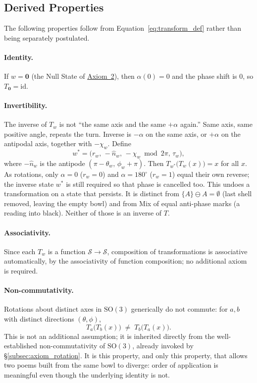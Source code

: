 \documentclass[12pt, a4paper]{article}
\begin{document}
\subsection{Derived Properties}
\label{subsec:transform_properties}
The following properties follow from Equation~\eqref{eq:transform_def}
rather than being separately postulated.

\paragraph{Identity.} If $w = \mathbf{0}$ (the Null State of
\hyperref[subsec:axiom_null]{Axiom~2}), then $\alpha(0) = 0$ and the phase
shift is $0$, so $T_{\mathbf{0}} = \mathrm{id}$.

\paragraph{Invertibility.}
The inverse of $T_w$ is not ``the same axis and the same $+\alpha$ again.'' Same axis, same positive angle, repeats the turn. Inverse is $-\alpha$ on the same axis, or $+\alpha$ on the antipodal axis, together with $-\chi_w$. Define
\begin{equation}
    w^{*} = \bigl(r_w,\,-\hat n_w,\,-\chi_w \bmod 2\pi,\,\tau_w\bigr),
\end{equation}
where $-\hat n_w$ is the antipode $(\pi-\theta_w,\,\phi_w+\pi)$.
Then $T_{w^{*}}\!\big(T_w(x)\big) = x$ for all $x$. As rotations, only $\alpha=0$ ($r_w=0$) and $\alpha=180^\circ$ ($r_w=1$) equal their own reverse; the inverse state $w^{*}$ is still required so that phase is cancelled too. This undoes a transformation on a state that persists. It is distinct from $\{A\}\ominus A=\emptyset$ (last shell removed, leaving the empty bowl) and from Mix of equal anti-phase marks (a reading into black). Neither of those is an inverse of $T$.

\paragraph{Associativity.} Since each $T_w$ is a function
$\mathcal{S} \to \mathcal{S}$, composition of transformations is
associative automatically, by the associativity of function
composition; no additional axiom is required.

\paragraph{Non-commutativity.} Rotations about distinct axes in
$\mathrm{SO}(3)$ generically do not commute: for $a, b$ with distinct
directions $(\theta,\phi)$,
\begin{equation}
    T_a\big(T_b(x)\big) \;\neq\; T_b\big(T_a(x)\big).
    \label{eq:noncommute}
\end{equation}
This is not an additional assumption; it is inherited directly from
the well-established non-commutativity of $\mathrm{SO}(3)$, already
invoked by \S\ref{subsec:axiom_rotation}. It is this property,
and only this property, that allows two poems built from the same
bowl to diverge: order of application is meaningful even
though the underlying identity is not.
\end{document}

